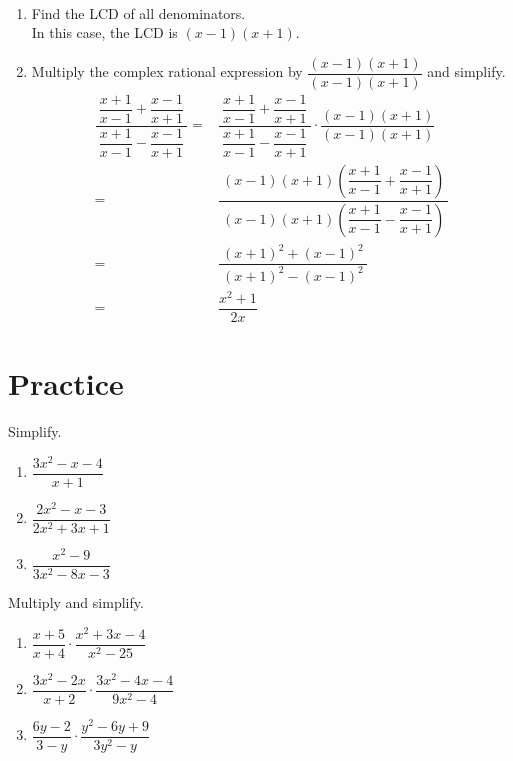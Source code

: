 \documentclass[en,11pt]{elegantbook}
\let\BeginKnitrBlock\begin \let\EndKnitrBlock\end
\begin{document}
\BeginKnitrBlock{solution}
{}\\

\begin{enumerate}
\def\labelenumi{\arabic{enumi}.}

\item
  Find the LCD of all denominators.\\
  In this case, the LCD is \((x-1)(x+1)\).
\item
  Multiply the complex rational expression by \(\dfrac{(x-1)(x+1)}{(x-1)(x+1)}\) and simplify.
  \[
  \begin{aligned}
   \dfrac{~\dfrac{x+1}{x-1}+\dfrac{x-1}{x+1}~}{~\dfrac{x+1}{x-1}-\dfrac{x-1}{x+1}~}
   =&\dfrac{~\dfrac{x+1}{x-1}+\dfrac{x-1}{x+1}~}{~\dfrac{x+1}{x-1}-\dfrac{x-1}{x+1}~}\cdot \dfrac{(x-1)(x+1)}{(x-1)(x+1)}\\[5pt]
   =& \dfrac{~(x-1)(x+1)\left(\dfrac{x+1}{x-1}+\dfrac{x-1}{x+1}\right)~}{~(x-1)(x+1)\left(\dfrac{x+1}{x-1}-\dfrac{x-1}{x+1}\right)~}\\[5pt]
   =& \dfrac{~(x+1)^2+(x-1)^2~}{~(x+1)^2-(x-1)^2~}\\[5pt]
   =& \dfrac{x^2+1}{2x}
  \end{aligned}
  \]
\end{enumerate}
\EndKnitrBlock{solution}

\newpage

\hypertarget{practice-2}{%
\section{Practice}\label{practice-2}}

\BeginKnitrBlock{exercise}
\protect\hypertarget{exr:unnamed-chunk-54}{}{\label{exr:unnamed-chunk-54} }
Simplify.

\begin{enumerate}
\def\labelenumi{\arabic{enumi}.}
\item
  \(\dfrac{3x^2-x-4}{x+1}\)
\item
  \(\dfrac{2x^2-x-3}{2x^2+3x+1}\)
\item
  \(\dfrac{x^2-9}{3x^2-8x-3}\)
\end{enumerate}
\EndKnitrBlock{exercise}

\BeginKnitrBlock{exercise}
\protect\hypertarget{exr:unnamed-chunk-55}{}{\label{exr:unnamed-chunk-55} }
Multiply and simplify.

\begin{enumerate}
\def\labelenumi{\arabic{enumi}.}
\item
  \(\dfrac{x+5}{x+4}\cdot\dfrac{x^2+3x-4}{x^2-25}\)
\item
  \(\dfrac{3x^2-2x}{x+2}\cdot\dfrac{3x^2-4x-4}{9x^2-4}\)
\item
  \(\dfrac{6y-2}{3-y}\cdot\dfrac{y^2-6y+9}{3y^2-y}\)
\end{enumerate}
\EndKnitrBlock{exercise}
\end{document}
